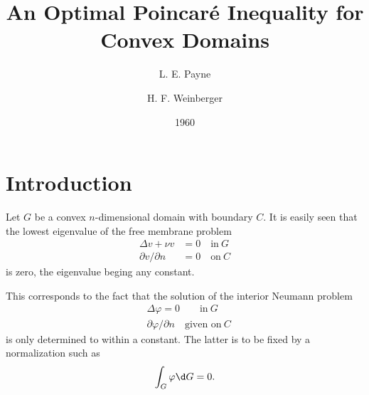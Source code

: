 \documentclass{article}
\title{An Optimal Poincar\'e Inequality for Convex Domains}
\author{L. E. Payne \and H. F. Weinberger}
\date{1960}
\theoremstyle{remarks}
\begin{document}
\maketitle

\section{Introduction}

Let $G$ be a convex $n$-dimensional domain with boundary $C$.
It is easily seen that the lowest eigenvalue of the free membrane problem
\begin{equation}\label{eq:1.1}
  \begin{aligned}
    \Delta v + \nu v & = 0 \quad \text{in}\ G \\
    \partial v/\partial n & = 0 \quad \text{on}\ C 
  \end{aligned}
\end{equation}
is zero, the eigenvalue beging any constant.

This corresponds to the fact that the solution of the interior
Neumann problem
\begin{equation}\label{eq:1.2}
  \begin{aligned}
    & \Delta \varphi = 0 \quad\quad \text{in}\ G \\
    & \partial\varphi/\partial n \quad \text{given on}\ C
  \end{aligned}
\end{equation}
is only determined to within a constant. The latter is to be fixed by a normalization
such as
\begin{equation}\label{eq:1.3}
  \int_G \varphi \d G = 0. 
\end{equation}
\end{document}
